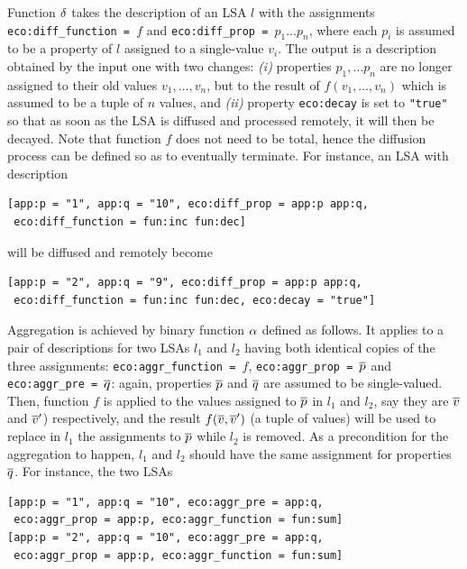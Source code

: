 \documentclass[12pt,a4paper,twoside,openright]{book}
\begin{document}
Function $\delta$ takes the description of an LSA $l$ with the assignments \texttt{eco:diff\_function = $f$} and \texttt{eco:diff\_prop = $p_1 \ldots p_n$}, where each $p_i$ is assumed to be a property of $l$ assigned to a single-value $v_i$.
%
The output is a description obtained by the input one with two changes: \emph{(i)} properties $p_1,\ldots p_n$ are no longer assigned to their old values $v_1,\ldots,v_n$, but to the result of $f(v_1,\ldots,v_n)$ which is assumed to be a tuple of $n$ values, and \emph{(ii)} property \texttt{eco:decay} is set to \texttt{"true"} so that as soon as the LSA is diffused and processed remotely, it will then be decayed.
%
Note that function $f$ does not need to be total, hence the diffusion process can be defined so as to eventually terminate.
%
For instance, an LSA with description

{\begin{Verbatim}[samepage=true, frame=single]
[app:p = "1", app:q = "10", eco:diff_prop = app:p app:q, 
 eco:diff_function = fun:inc fun:dec]
\end{Verbatim}
}

\noindent will be diffused and remotely become

{\begin{Verbatim}[samepage=true, frame=single]
[app:p = "2", app:q = "9", eco:diff_prop = app:p app:q, 
 eco:diff_function = fun:inc fun:dec, eco:decay = "true"]
\end{Verbatim}
}

Aggregation is achieved by binary function $\alpha$ defined as follows. It applies to a pair of descriptions for two LSAs $l_1$ and $l_2$ having both identical copies of the three assignments: \texttt{eco:aggr\_function = $f$}, \texttt{eco:aggr\_prop = $\overline{p}$} and \texttt{eco:aggr\_pre = $\overline{q}$}: again, properties $\overline{p}$ and $\overline{q}$ are assumed to be single-valued.
%
Then, function $f$ is applied to the values assigned to $\overline{p}$ in $l_1$ and $l_2$, say they are $\overline{v}$ and $\overline{v}'$) respectively, and the result $f(\overline{v},\overline{v}')$ (a tuple of values) will be used to replace in $l_1$ the assignments to $\overline{p}$ while $l_2$ is removed.
%
As a precondition for the aggregation to happen, $l_1$ and $l_2$ should have the same assignment for properties $\overline{q}$.
%
For instance, the two LSAs

{\begin{Verbatim}[samepage=true, frame=single]
[app:p = "1", app:q = "10", eco:aggr_pre = app:q, 
 eco:aggr_prop = app:p, eco:aggr_function = fun:sum]
[app:p = "2", app:q = "10", eco:aggr_pre = app:q, 
 eco:aggr_prop = app:p, eco:aggr_function = fun:sum]
\end{Verbatim}
}
\end{document}
